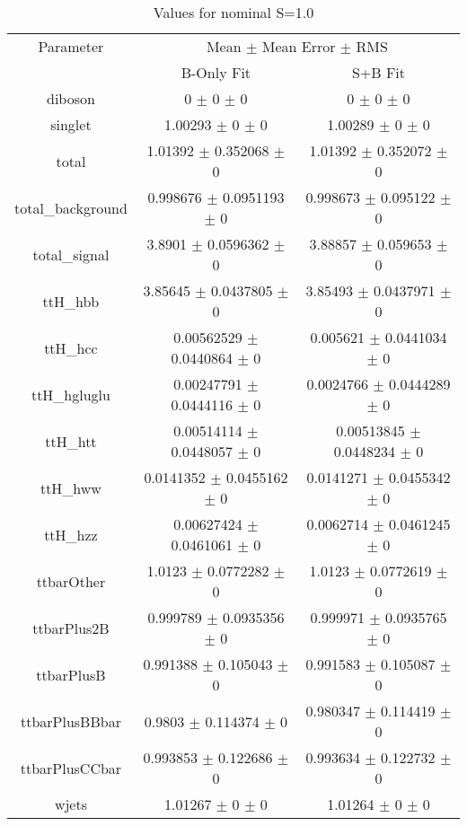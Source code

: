 \begin{table}
\centering
\caption{Values for nominal S=1.0}
\begin{tabular}{ccc}
\toprule
Parameter & \multicolumn{2}{c}{Mean $\pm$ Mean Error $\pm$ RMS}\\
 & B-Only Fit & S+B Fit\\
\midrule
diboson & \num{0} $\pm$ \num{0} $\pm$ \num{0} & \num{0} $\pm$ \num{0} $\pm$ \num{0}\\
singlet & \num{1.00293} $\pm$ \num{0} $\pm$ \num{0} & \num{1.00289} $\pm$ \num{0} $\pm$ \num{0}\\
total & \num{1.01392} $\pm$ \num{0.352068} $\pm$ \num{0} & \num{1.01392} $\pm$ \num{0.352072} $\pm$ \num{0}\\
total\_background & \num{0.998676} $\pm$ \num{0.0951193} $\pm$ \num{0} & \num{0.998673} $\pm$ \num{0.095122} $\pm$ \num{0}\\
total\_signal & \num{3.8901} $\pm$ \num{0.0596362} $\pm$ \num{0} & \num{3.88857} $\pm$ \num{0.059653} $\pm$ \num{0}\\
ttH\_hbb & \num{3.85645} $\pm$ \num{0.0437805} $\pm$ \num{0} & \num{3.85493} $\pm$ \num{0.0437971} $\pm$ \num{0}\\
ttH\_hcc & \num{0.00562529} $\pm$ \num{0.0440864} $\pm$ \num{0} & \num{0.005621} $\pm$ \num{0.0441034} $\pm$ \num{0}\\
ttH\_hgluglu & \num{0.00247791} $\pm$ \num{0.0444116} $\pm$ \num{0} & \num{0.0024766} $\pm$ \num{0.0444289} $\pm$ \num{0}\\
ttH\_htt & \num{0.00514114} $\pm$ \num{0.0448057} $\pm$ \num{0} & \num{0.00513845} $\pm$ \num{0.0448234} $\pm$ \num{0}\\
ttH\_hww & \num{0.0141352} $\pm$ \num{0.0455162} $\pm$ \num{0} & \num{0.0141271} $\pm$ \num{0.0455342} $\pm$ \num{0}\\
ttH\_hzz & \num{0.00627424} $\pm$ \num{0.0461061} $\pm$ \num{0} & \num{0.0062714} $\pm$ \num{0.0461245} $\pm$ \num{0}\\
ttbarOther & \num{1.0123} $\pm$ \num{0.0772282} $\pm$ \num{0} & \num{1.0123} $\pm$ \num{0.0772619} $\pm$ \num{0}\\
ttbarPlus2B & \num{0.999789} $\pm$ \num{0.0935356} $\pm$ \num{0} & \num{0.999971} $\pm$ \num{0.0935765} $\pm$ \num{0}\\
ttbarPlusB & \num{0.991388} $\pm$ \num{0.105043} $\pm$ \num{0} & \num{0.991583} $\pm$ \num{0.105087} $\pm$ \num{0}\\
ttbarPlusBBbar & \num{0.9803} $\pm$ \num{0.114374} $\pm$ \num{0} & \num{0.980347} $\pm$ \num{0.114419} $\pm$ \num{0}\\
ttbarPlusCCbar & \num{0.993853} $\pm$ \num{0.122686} $\pm$ \num{0} & \num{0.993634} $\pm$ \num{0.122732} $\pm$ \num{0}\\
wjets & \num{1.01267} $\pm$ \num{0} $\pm$ \num{0} & \num{1.01264} $\pm$ \num{0} $\pm$ \num{0}\\
\bottomrule
\end{tabular}
\end{table}